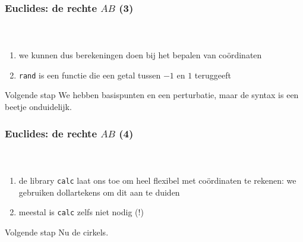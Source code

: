 \begin{frame}
  \frametitle{Euclides: de rechte $AB$ (3)}

  \begin{columns}
    \begin{column}{.67\textwidth}
      \inputminted[fontsize = \scriptsize]{latex}{tikz/triangle/1c.tikz}
    \end{column}
    \begin{column}{.33\textwidth}
      
    \end{column}
  \end{columns}

  \small
  \begin{enumerate}
    \item\pause we kunnen dus berekeningen doen bij het bepalen van co\"ordinaten
    \item\pause \texttt{rand} is een functie die een getal tussen $-1$ en $1$ teruggeeft
  \end{enumerate}
  \pause
  \begin{block}{Volgende stap}
    We hebben basispunten en een perturbatie, maar de syntax is een beetje onduidelijk.
  \end{block}
\end{frame}

\begin{frame}
  \frametitle{Euclides: de rechte $AB$ (4)}

  \begin{columns}
    \begin{column}{.67\textwidth}
      \inputminted[fontsize = \scriptsize]{latex}{tikz/triangle/1d.tikz}
    \end{column}
    \begin{column}{.33\textwidth}
      
    \end{column}
  \end{columns}

  \small
  \begin{enumerate}
    \item\pause de library \texttt{calc} laat ons toe om heel flexibel met co\"ordinaten te rekenen: we gebruiken dollartekens om dit aan te duiden
    \item\pause meestal is \texttt{calc} zelfs niet nodig (!)
  \end{enumerate}
  \pause
  \begin{block}{Volgende stap}
    Nu de cirkels.
  \end{block}
\end{frame}


